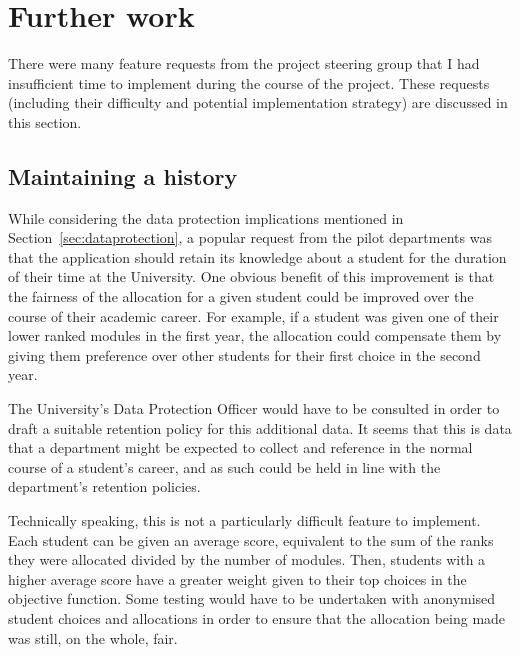 
\section{Further work}
\label{sec:furtherwork}


There were many feature requests from the project steering group that I had
insufficient time to implement during the course of the project. These
requests (including their difficulty and potential implementation strategy)
are discussed in this section.

\subsection{Maintaining a history}

While considering the data protection implications mentioned in
Section~\ref{sec:dataprotection}, a popular request from the pilot departments
was that the application should retain its knowledge about a student for the
duration of their time at the University. One obvious benefit of this
improvement is that the fairness of the allocation for a given student could
be improved over the course of their academic career. For example, if a
student was given one of their lower ranked modules in the first year, the
allocation could compensate them by giving them preference over other students
for their first choice in the second year.

The University's Data Protection Officer would have to be consulted in order
to draft a suitable retention policy for this additional data. It seems that
this is data that a department might be expected to collect and reference in
the normal course of a student's career, and as such could be held in line
with the department's retention policies.

Technically speaking, this is not a particularly difficult feature to
implement. Each student can be given an average score, equivalent to the sum
of the ranks they were allocated divided by the number of modules. Then,
students with a higher average score have a greater weight given to their top
choices in the objective function. Some testing would have to be undertaken
with anonymised student choices and allocations in order to ensure that the
allocation being made was still, on the whole, fair.


